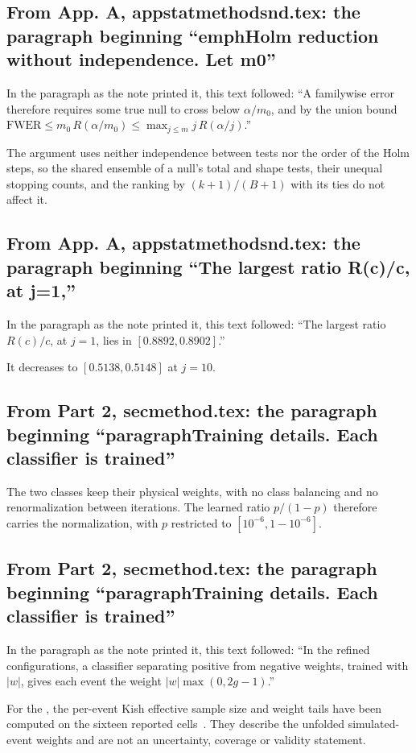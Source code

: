 \subsection{From App. A, appstatmethodsnd.tex: the paragraph beginning ``emphHolm reduction without independence. Let m0''}
In the paragraph as the note printed it, this text followed: ``A familywise error therefore requires some true null to cross below $\alpha/m_{0}$, and by the union bound $\mathrm{FWER}\le m_{0}\,R(\alpha/m_{0})\le\max_{j\le m}j\,R(\alpha/j)$.''\par
The argument uses neither independence between tests nor the order of the Holm steps, so the shared ensemble of a null's total and shape tests, their unequal stopping counts, and the ranking by $(k+1)/(B+1)$ with its ties do not affect it.

\subsection{From App. A, appstatmethodsnd.tex: the paragraph beginning ``The largest ratio R(c)/c, at j=1,''}
In the paragraph as the note printed it, this text followed: ``The largest ratio $R(c)/c$, at $j=1$, lies in $[0.8892,0.8902]$.''\par
It decreases to $[0.5138,0.5148]$ at $j=10$.

\subsection{From Part 2, secmethod.tex: the paragraph beginning ``paragraphTraining details. Each classifier is trained''}
The two classes keep their physical weights, with no class balancing and no renormalization between iterations. The learned ratio $p/(1-p)$ therefore carries the normalization, with $p$ restricted to $[10^{-6},1-10^{-6}]$.

\subsection{From Part 2, secmethod.tex: the paragraph beginning ``paragraphTraining details. Each classifier is trained''}
In the paragraph as the note printed it, this text followed: ``In the refined configurations, a classifier separating positive from negative weights, trained with $|w|$, gives each event the weight $|w|\max(0,2g-1)$.''\par
For the \estMultiD{}, the per-event Kish effective sample size and weight tails have been computed on the sixteen reported cells~\cite{UnfoldedWeightsESS2026}. They describe the unfolded simulated-event weights and are not an uncertainty, coverage or validity statement.

